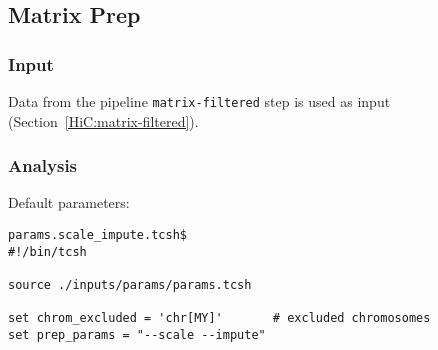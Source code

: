 \subsection{Matrix Prep}\label{HiC:matrix-prep} %
\subsubsection{Input} %
Data from the pipeline \texttt{matrix-filtered} step is used as input (Section~\ref{HiC:matrix-filtered}).
\subsubsection{Analysis} %
Default parameters:
\begin{lstlisting}
params.scale_impute.tcsh$
#!/bin/tcsh

source ./inputs/params/params.tcsh

set chrom_excluded = 'chr[MY]'       # excluded chromosomes
set prep_params = "--scale --impute"
\end{lstlisting}
